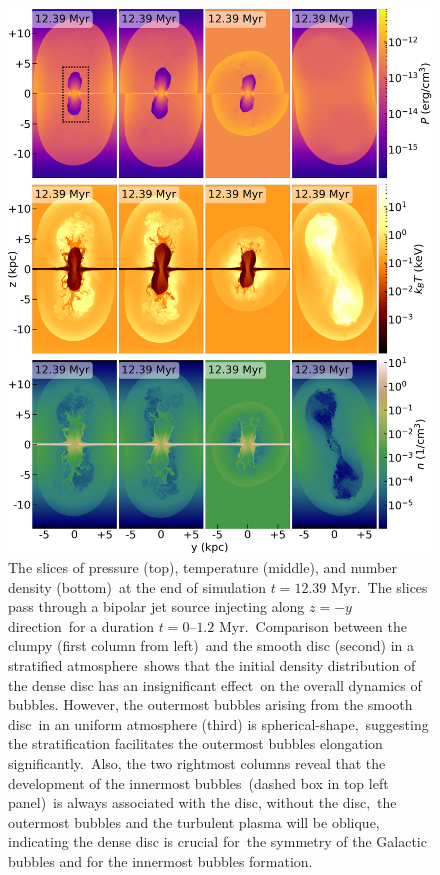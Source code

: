 \documentclass[twocolumn]{aastex631}
\begin{document}
  \begin{figure}
    \includegraphics[width=\columnwidth]{figures/fig__jetI5+ismSeed3-45deg.png}
    \caption{
             The slices of pressure (top), temperature (middle), and number density (bottom)\
             at the end of simulation $t=12.39$ Myr.\
             The slices pass through a bipolar jet source injecting along $z=-y$ direction\
             for a duration $t=0$--$1.2$ Myr.\
             Comparison between the clumpy (first column from left)\
             and the smooth disc (second) in a stratified atmosphere\
             shows that the initial density distribution of the dense disc has an insignificant effect\
             on the overall dynamics of bubbles. However, the outermost bubbles arising from the smooth disc\
             in an uniform atmosphere (third) is spherical-shape,\
             suggesting the stratification facilitates the outermost bubbles elongation significantly.\
             Also, the two rightmost columns reveal that the development of the innermost bubbles\
             (dashed box in top left panel)\
             is always associated with the disc, without the disc,\
             the outermost bubbles and the turbulent plasma will be oblique,
             indicating the dense disc is crucial for\
             the symmetry of the Galactic bubbles and for the innermost bubbles formation.
             }
    \label{fig__jetI5+ismSeed3-45deg}
  \end{figure}
\end{document}
